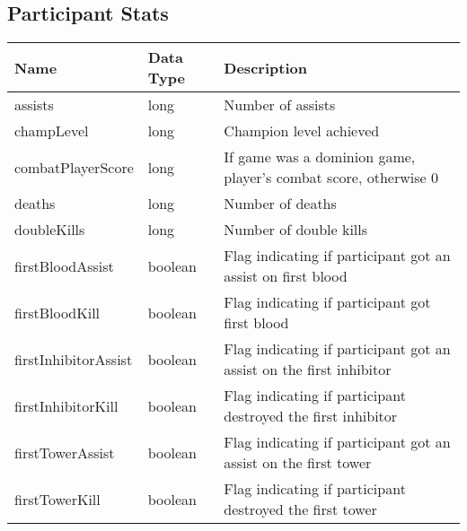 \subsection{Participant Stats}
\begin{table}[!h]
\tiny
\centering
\begin{tabular}{llp{5cm}}
\textbf{Name}                   & \textbf{Data Type} & \textbf{Description}                                                            \\ \hline
assists                         & long               & Number of assists                                                               \\ \hline
champLevel                      & long               & Champion level achieved                                                         \\ \hline
combatPlayerScore               & long               & If game was a dominion game, player's combat score, otherwise 0                 \\ \hline
deaths                          & long               & Number of deaths                                                                \\ \hline
doubleKills                     & long               & Number of double kills                                                          \\ \hline
firstBloodAssist                & boolean            & Flag indicating if participant got an assist on first blood                     \\ \hline
firstBloodKill                  & boolean            & Flag indicating if participant got first blood                                  \\ \hline
firstInhibitorAssist            & boolean            & Flag indicating if participant got an assist on the first inhibitor             \\ \hline
firstInhibitorKill              & boolean            & Flag indicating if participant destroyed the first inhibitor                    \\ \hline
firstTowerAssist                & boolean            & Flag indicating if participant got an assist on the first tower                 \\ \hline
firstTowerKill                  & boolean            & Flag indicating if participant destroyed the first tower                        \\ \hline

\end{tabular}
\end{table}

